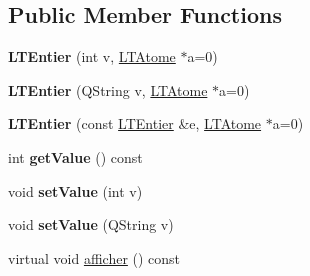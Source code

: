 \subsection*{Public Member Functions}
\begin{DoxyCompactItemize}
\item 
{\bfseries L\+T\+Entier} (int v, \hyperlink{class_l_t_atome}{L\+T\+Atome} $\ast$a=0)\hypertarget{class_l_t_entier_a5966d1f1fc4f16d154135681e5b51bd7}{}\label{class_l_t_entier_a5966d1f1fc4f16d154135681e5b51bd7}

\item 
{\bfseries L\+T\+Entier} (Q\+String v, \hyperlink{class_l_t_atome}{L\+T\+Atome} $\ast$a=0)\hypertarget{class_l_t_entier_a3cefeb71a20650403cfbd91b243550ff}{}\label{class_l_t_entier_a3cefeb71a20650403cfbd91b243550ff}

\item 
{\bfseries L\+T\+Entier} (const \hyperlink{class_l_t_entier}{L\+T\+Entier} \&e, \hyperlink{class_l_t_atome}{L\+T\+Atome} $\ast$a=0)\hypertarget{class_l_t_entier_ab91a13030b55f961a4630869e154501d}{}\label{class_l_t_entier_ab91a13030b55f961a4630869e154501d}

\item 
int {\bfseries get\+Value} () const \hypertarget{class_l_t_entier_a1b34875fe8312a408b221967a9ea9863}{}\label{class_l_t_entier_a1b34875fe8312a408b221967a9ea9863}

\item 
void {\bfseries set\+Value} (int v)\hypertarget{class_l_t_entier_acfd0a6e53763fa7b0dc003e76b21d123}{}\label{class_l_t_entier_acfd0a6e53763fa7b0dc003e76b21d123}

\item 
void {\bfseries set\+Value} (Q\+String v)\hypertarget{class_l_t_entier_a647928737573ef6077e60c5e05052347}{}\label{class_l_t_entier_a647928737573ef6077e60c5e05052347}

\item 
virtual void \hyperlink{class_l_t_entier_a00b3854cd7ac676cbf3f0f8ff698da73}{afficher} () const \hypertarget{class_l_t_entier_a00b3854cd7ac676cbf3f0f8ff698da73}{}\label{class_l_t_entier_a00b3854cd7ac676cbf3f0f8ff698da73}


\end{DoxyCompactItemize}

